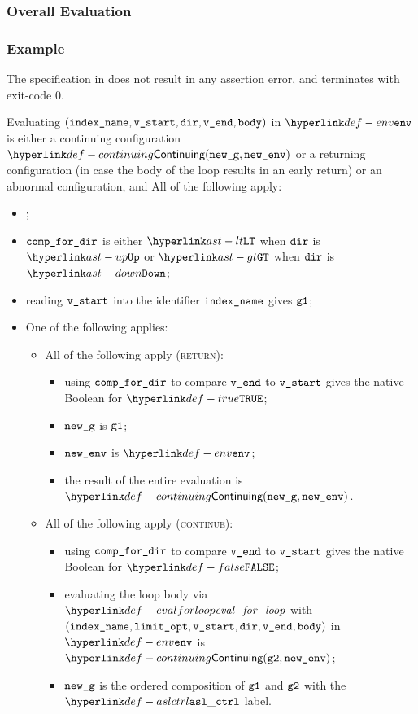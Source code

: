 \subsubsection{Overall Evaluation}
\subsubsection{Example}
The specification in 
does not result in any assertion error, and terminates with exit-code $0$.

Evaluating $(\texttt{index\_name}, \texttt{v\_start}, \texttt{dir}, \texttt{v\_end}, \texttt{body})$ in $\env$ is either
a continuing configuration $\Continuing(\newg, \newenv)$ or a returning configuration
(in case the body of the loop results in an early return)
or an abnormal configuration,
and All of the following apply:
\begin{itemize}
  \item \Proseticklooplimit{$\vlimitopt$}{$\vnextlimitopt$}\ProseOrError;
  \item $\texttt{comp\_for\_dir}$ is either $\LT$ when $\texttt{dir}$ is $\UP$ or $\GT$ when $\texttt{dir}$ is $\DOWN$;
  \item reading $\texttt{v\_start}$ into the identifier $\texttt{index\_name}$ gives $\texttt{g1}$;
  \item One of the following applies:
    \begin{itemize}
    \item All of the following apply (\textsc{return}):
    \begin{itemize}
      \item using $\texttt{comp\_for\_dir}$ to compare $\texttt{v\_end}$ to $\texttt{v\_start}$ gives the native Boolean for $\True$;
      \item $\texttt{new\_g}$ is $\texttt{g1}$;
      \item $\texttt{new\_env}$ is $\env$;
      \item the result of the entire evaluation is $\Continuing(\newg, \newenv)$.
    \end{itemize}
    \item All of the following apply (\textsc{continue}):
    \begin{itemize}
      \item using $\texttt{comp\_for\_dir}$ to compare $\texttt{v\_end}$ to $\texttt{v\_start}$ gives the native Boolean for $\False$;
      \item evaluating the loop body via $\evalforloop$ with \\ $(\texttt{index\_name}, \texttt{limit\_opt}, \texttt{v\_start}, \texttt{dir}, \texttt{v\_end}, \texttt{body})$
      in $\env$ is \\ $\Continuing(\vgtwo, \newenv)$\ProseTerminateAs{\ReturningConfig, \ThrowingConfig, \DynErrorConfig};
      \item $\texttt{new\_g}$ is the ordered composition of $\texttt{g1}$ and $\texttt{g2}$ with the $\aslctrl$ label.
    \end{itemize}
  \end{itemize}
\end{itemize}

